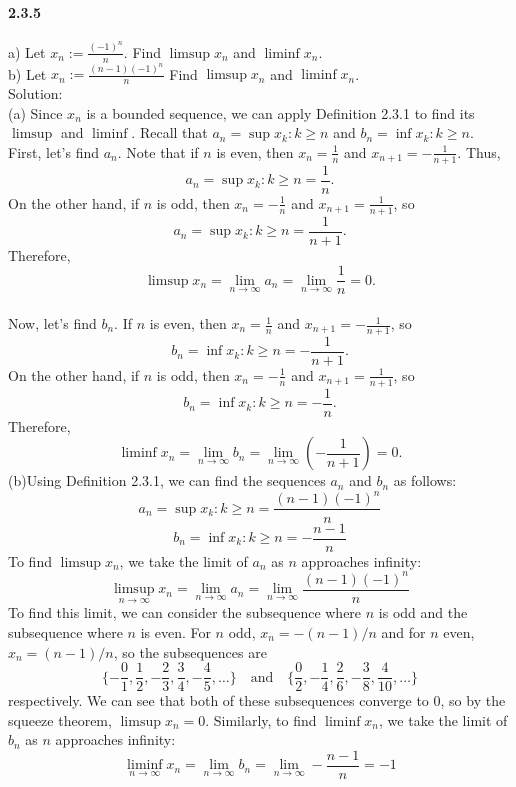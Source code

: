 \documentclass{article}
\begin{document}
\paragraph{2.3.5}
a) Let $x_n:=\frac{(-1)^n}{n}$. Find $\limsup x_n$ and $\liminf x_n$.\\
b) Let $x_n:=\frac{(n-1)(-1)^n}{n}$ Find $\limsup x_n$ and $\liminf x_n$.\\
Solution:\\
(a) Since ${x_n}$ is a bounded sequence, we can apply Definition 2.3.1 to find its $\limsup$ and $\liminf$. Recall that $a_n = \sup{x_k : k \geq n}$ and $b_n = \inf{x_k : k \geq n}$.\\
First, let's find $a_n$. Note that if $n$ is even, then $x_n = \frac{1}{n}$ and $x_{n+1} = -\frac{1}{n+1}$. Thus,
$$a_n = \sup{x_k : k \geq n} = \frac{1}{n}.$$
On the other hand, if $n$ is odd, then $x_n = -\frac{1}{n}$ and $x_{n+1} = \frac{1}{n+1}$, so
$$a_n = \sup{x_k : k \geq n} = \frac{1}{n+1}.$$
Therefore,
$$\limsup x_n = \lim_{n \to \infty} a_n = \lim_{n \to \infty} \frac{1}{n} = 0.$$\\
Now, let's find $b_n$. If $n$ is even, then $x_n = \frac{1}{n}$ and $x_{n+1} = -\frac{1}{n+1}$, so
$$b_n = \inf{x_k : k \geq n} = -\frac{1}{n+1}.$$
On the other hand, if $n$ is odd, then $x_n = -\frac{1}{n}$ and $x_{n+1} = \frac{1}{n+1}$, so
$$b_n = \inf{x_k : k \geq n} = -\frac{1}{n}.$$
Therefore,
$$\liminf x_n = \lim_{n \to \infty} b_n = \lim_{n \to \infty} (-\frac{1}{n+1}) = 0.$$
(b)Using Definition 2.3.1, we can find the sequences ${a_n}$ and ${b_n}$ as follows:
$$a_n = \sup{x_k : k \geq n} = \frac{(n-1)(-1)^n}{n}$$
$$b_n = \inf{x_k : k \geq n} = -\frac{n-1}{n}$$
To find $\limsup x_n$, we take the limit of ${a_n}$ as $n$ approaches infinity:
$$\limsup_{n \to \infty} x_n = \lim_{n\to\infty} a_n = \lim_{n\to\infty} \frac{(n-1)(-1)^n}{n}$$
To find this limit, we can consider the subsequence where $n$ is odd and the subsequence where $n$ is even. For $n$ odd, $x_n = -(n-1)/n$ and for $n$ even, $x_n = (n-1)/n$, so the subsequences are
$$\{-\frac{0}{1}, \frac{1}{2}, -\frac{2}{3}, \frac{3}{4}, -\frac{4}{5}, \ldots\} \quad \text{and} \quad \{\frac{0}{2}, -\frac{1}{4}, \frac{2}{6}, -\frac{3}{8}, \frac{4}{10}, \ldots\}$$
respectively. We can see that both of these subsequences converge to 0, so by the squeeze theorem, $\limsup x_n = 0$.
Similarly, to find $\liminf x_n$, we take the limit of ${b_n}$ as $n$ approaches infinity:
$$\liminf_{n \to \infty} x_n = \lim_{n\to\infty} b_n = \lim_{n\to\infty} -\frac{n-1}{n} = -1$$
\end{document}
